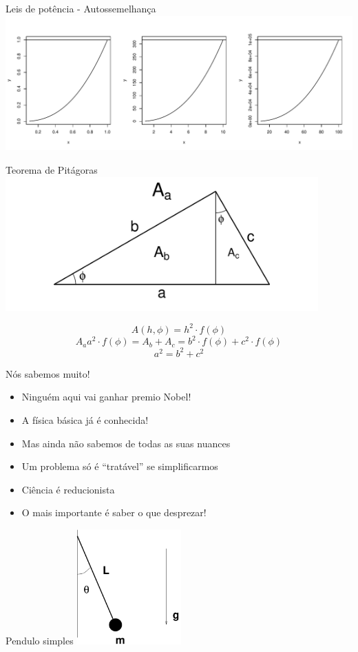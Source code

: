 \documentclass{beamer}
\begin{document}
\begin{frame}{Leis de potência - Autossemelhança}
  \centering
  \includegraphics[width=\textwidth]{./figuras/power.pdf}
\end{frame}


\begin{frame}{Teorema de Pitágoras}
  \centering
  \includegraphics[width=0.9\textwidth]{./figuras/pitagoras}
  
\[
A(h,\phi) = h^2\cdot f(\phi)
\]
\[
A_a a^2\cdot f(\phi) = A_b + A_c = b^2\cdot f(\phi) + c^2\cdot f(\phi)
\]
\[
a^2 = b^2 + c^2
\]
\end{frame}

\begin{frame}{Nós sabemos muito!}
  \begin{itemize}
  \item Ninguém aqui vai ganhar premio Nobel!
  \item A física básica já é conhecida!
  \item Mas ainda não sabemos de todas as suas nuances
  \item Um problema só é ``tratável'' se simplificarmos
  \item Ciência é reducionista
  \item O mais  importante é saber o que desprezar!
  \end{itemize}
\end{frame}

\begin{frame}{Pendulo simples}
  \centering
  \includegraphics[width=0.3\textwidth]{./figuras/pendulo.pdf}
\end{frame}
\end{document}
